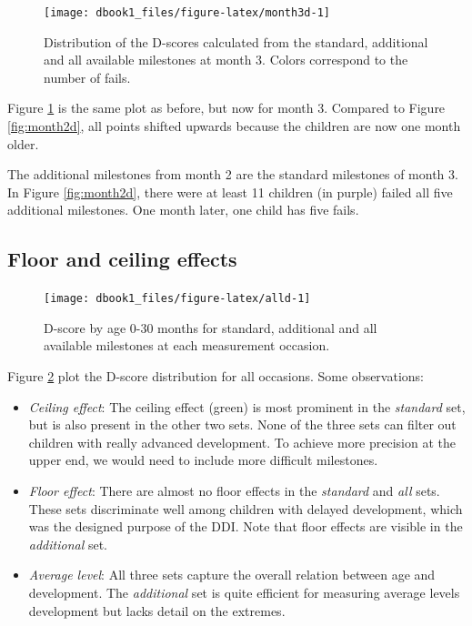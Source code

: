 \documentclass[
]{book}
\begin{document}
\begin{figure}

{\centering \texttt{[image: dbook1\_files/figure-latex/month3d-1]} 

}

\caption{Distribution of the D-scores calculated from the standard, additional and all available milestones at month 3. Colors correspond to the number of fails.}\label{fig:month3d}
\end{figure}



Figure \ref{fig:month3d} is the same plot as before, but now for month 3. Compared to Figure \ref{fig:month2d}, all points shifted upwards because the children are now one month older.

The additional milestones from month 2 are the standard milestones of month 3. In Figure \ref{fig:month2d}, there were at least 11 children (in purple) failed all five additional milestones. One month later, one child has five fails.

\hypertarget{floor-and-ceiling-effects}{%
\subsection{Floor and ceiling effects}\label{floor-and-ceiling-effects}}

\begin{figure}

{\centering \texttt{[image: dbook1\_files/figure-latex/alld-1]} 

}

\caption{D-score by age 0-30 months for standard, additional and all available milestones at each measurement occasion.}\label{fig:alld}
\end{figure}



Figure \ref{fig:alld} plot the D-score distribution for all occasions. Some observations:

\begin{itemize}
\item
  \emph{Ceiling effect}: The ceiling effect (green) is most prominent in the \emph{standard} set, but is also present in the other two sets. None of the three sets can filter out children with really advanced development. To achieve more precision at the upper end, we would need to include more difficult milestones.
\item
  \emph{Floor effect}: There are almost no floor effects in the \emph{standard} and \emph{all} sets. These sets discriminate well among children with delayed development, which was the designed purpose of the DDI. Note that floor effects are visible in the \emph{additional} set.
\item
  \emph{Average level}: All three sets capture the overall relation between age and development. The \emph{additional} set is quite efficient for measuring average levels development but lacks detail on the extremes.
\end{itemize}
\end{document}
